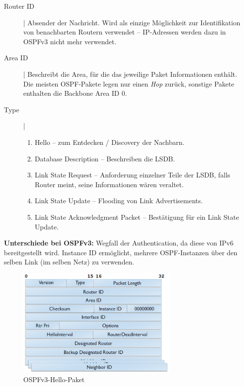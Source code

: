 \documentclass{article} %
\begin{document}
\begin{description}
	\item [Router ID] | Absender der Nachricht.
	Wird als einzige Möglichkeit zur Identifikation von benachbarten Routern verwendet – IP-Adressen werden dazu in OSPFv3 nicht mehr verwendet.
	\item [Area ID] | Beschreibt die Area, für die das jeweilige Paket Informationen enthält.
	Die meisten OSPF-Pakete legen nur einen \emph{Hop} zurück, sonstige Pakete enthalten die Backbone Area ID 0.
	\item [Type] | \begin{enumerate}
		\item 	Hello – zum Entdecken / Discovery der Nachbarn.
		\item Database Description – Beschreiben die LSDB.
		\item Link State Request – Anforderung einzelner Teile der LSDB, falls Router meint, seine Informationen wären veraltet.
		\item Link State Update – Flooding von Link Advertisements.
		\item Link State Acknowledgment Packet – Bestätigung für ein Link State Update.
	\end{enumerate}
\end{description}

\textbf{Unterschiede bei OSPFv3:} Wegfall der Authentication, da diese von IPv6
bereitgestellt wird.
Instance ID ermöglicht, mehrere OSPF-Instanzen über den selben Link (im selben Netz) zu verwenden.


\begin{figure}[h]
	\begin{center}
		\includegraphics[width=8cm]{img/ospfv3_hello}
		\caption{OSPFv3-Hello-Paket}
	\end{center}
\end{figure}
\end{document}
